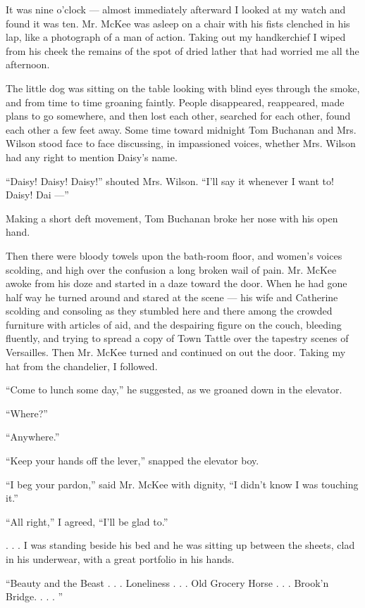 \documentclass{znotebook}
\begin{document}
It was nine o'clock ---{} almost immediately afterward I looked at my watch and found it was ten. Mr. McKee was asleep on a chair with his fists clenched in his lap, like a photograph of a man of action. Taking out my handkerchief I wiped from his cheek the remains of the spot of dried lather that had worried me all the afternoon.

The little dog was sitting on the table looking with blind eyes through the smoke, and from time to time groaning faintly. People disappeared, reappeared, made plans to go somewhere, and then lost each other, searched for each other, found each other a few feet away. Some time toward midnight Tom Buchanan and Mrs. Wilson stood face to face discussing, in impassioned voices, whether Mrs. Wilson had any right to mention Daisy's name.

``Daisy! Daisy! Daisy!'' shouted Mrs. Wilson. ``I'll say it whenever I want to! Daisy! Dai ---''

Making a short deft movement, Tom Buchanan broke her nose with his open hand.

Then there were bloody towels upon the bath-room floor, and women's voices scolding, and high over the confusion a long broken wail of pain. Mr. McKee awoke from his doze and started in a daze toward the door. When he had gone half way he turned around and stared at the scene ---{} his wife and Catherine scolding and consoling as they stumbled here and there among the crowded furniture with articles of aid, and the despairing figure on the couch, bleeding fluently, and trying to spread a copy of Town Tattle over the tapestry scenes of Versailles. Then Mr. McKee turned and continued on out the door. Taking my hat from the chandelier, I followed.

``Come to lunch some day,'' he suggested, as we groaned down in the elevator.

``Where?''

``Anywhere.''

``Keep your hands off the lever,'' snapped the elevator boy.

``I beg your pardon,'' said Mr. McKee with dignity, ``I didn't know I was touching it.''

``All right,'' I agreed, ``I'll be glad to.''

. . . I was standing beside his bed and he was sitting up between the sheets, clad in his underwear, with a great portfolio in his hands.

``Beauty and the Beast . . . Loneliness . . . Old Grocery Horse . . . Brook'n Bridge. . . . ''
\end{document}
